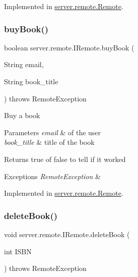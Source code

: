 Implemented in \hyperlink{classserver_1_1remote_1_1_remote_a38bce20fa59064fe8d970164d6155435}{server.\+remote.\+Remote}.

\mbox{\label{interfaceserver_1_1remote_1_1_i_remote_a5ecb918e7d2650346770f3ff5676c25b}} 
\subsubsection{\texorpdfstring{buy\+Book()}{buyBook()}}
{\footnotesize\ttfamily boolean server.\+remote.\+I\+Remote.\+buy\+Book (\begin{DoxyParamCaption}\item[{String}]{email,  }\item[{String}]{book\+\_\+title }\end{DoxyParamCaption}) throws Remote\+Exception}

Buy a book 
\begin{DoxyParams}{Parameters}
{\em email} & of the user \\
\hline
{\em book\+\_\+title} & title of the book \\
\hline
\end{DoxyParams}
\begin{DoxyReturn}{Returns}
true of false to tell if it worked 
\end{DoxyReturn}

\begin{DoxyExceptions}{Exceptions}
{\em Remote\+Exception} & \\
\hline
\end{DoxyExceptions}


Implemented in \hyperlink{classserver_1_1remote_1_1_remote_af5d1abb1730b8db14ab9dd476df158d8}{server.\+remote.\+Remote}.

\mbox{\label{interfaceserver_1_1remote_1_1_i_remote_ac64967dff86a9c603d0c9eb815f222df}} 
\subsubsection{\texorpdfstring{delete\+Book()}{deleteBook()}}
{\footnotesize\ttfamily void server.\+remote.\+I\+Remote.\+delete\+Book (\begin{DoxyParamCaption}\item[{int}]{I\+S\+BN }\end{DoxyParamCaption}) throws Remote\+Exception}

